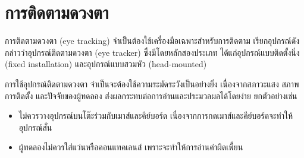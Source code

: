 \section{การติดตามดวงตา}

การติดตามดวงตา (eye tracking) \cite{eyetrack} จำเป็นต้องใช้เครื่องมือเฉพาะสำหรับการติดตาม เรียกอุปกรณ์ดังกล่าวว่าอุปกรณ์ติดตามดวงตา (eye tracker) ซึ่งมีโดยหลักสองประเภท ได้แก่อุปกรณ์แบบติดตั้งนิ่ง (fixed installation) และอุปกรณ์แบบสวมหัว (head-mounted)

การใช้อุปกรณ์ติดตามดวงตา จำเป็นจะต้องใช้ความระมัดระวังเป็นอย่างยิ่ง เนื่องจากสภาวะแสง สภาพการติดตั้ง และปัจจัยของผู้ทดลอง ส่งผลกระทบต่อการอ่านและประมวลผลได้โดยง่าย ยกตัวอย่างเช่น

\begin{itemize}
	\item ไม่ควรวางอุปกรณ์บนโต๊ะร่วมกับเมาส์และคีย์บอร์ด เนื่องจากการกดเมาส์และคีย์บอร์ดจะทำให้อุปกรณ์สั่น
	\item ผู้ทดลองไม่ควรใส่แว่นหรือคอนแทคเลนส์ เพราะจะทำให้การอ่านค่าผิดเพี้ยน
\end{itemize}